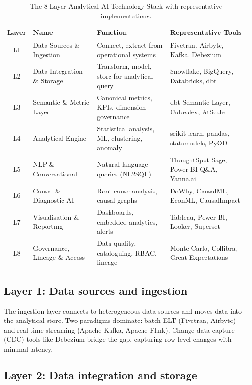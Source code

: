 \documentclass[preprint,12pt,authoryear]{elsarticle}
\theoremstyle{definition}
\begin{document}
\begin{table}[ht]
\centering
\caption{The 8-Layer Analytical AI Technology Stack with representative implementations.}
\label{tab:stack}
\begin{tabular}{clll}
\toprule
\textbf{Layer} & \textbf{Name} & \textbf{Function} & \textbf{Representative Tools} \\
\midrule
L1 & Data Sources \& Ingestion     & Connect, extract from operational systems   & Fivetran, Airbyte, Kafka, Debezium \\
L2 & Data Integration \& Storage   & Transform, model, store for analytical query & Snowflake, BigQuery, Databricks, dbt \\
L3 & Semantic \& Metric Layer      & Canonical metrics, KPIs, dimension governance & dbt Semantic Layer, Cube.dev, AtScale \\
L4 & Analytical Engine             & Statistical analysis, ML, clustering, anomaly & scikit-learn, pandas, statsmodels, PyOD \\
L5 & NLP \& Conversational         & Natural language queries (NL2SQL)            & ThoughtSpot Sage, Power BI Q\&A, Vanna.ai \\
L6 & Causal \& Diagnostic AI       & Root-cause analysis, causal graphs            & DoWhy, CausalML, EconML, CausalImpact \\
L7 & Visualisation \& Reporting    & Dashboards, embedded analytics, alerts        & Tableau, Power BI, Looker, Superset \\
L8 & Governance, Lineage \& Access & Data quality, cataloguing, RBAC, lineage      & Monte Carlo, Collibra, Great Expectations \\
\bottomrule
\end{tabular}
\end{table}

\subsection{Layer 1: Data sources and ingestion}

The ingestion layer connects to heterogeneous data sources and moves data into the analytical store. Two paradigms dominate: batch ELT (Fivetran, Airbyte) and real-time streaming (Apache Kafka, Apache Flink). Change data capture (CDC) tools like Debezium bridge the gap, capturing row-level changes with minimal latency.

\subsection{Layer 2: Data integration and storage}
\end{document}
